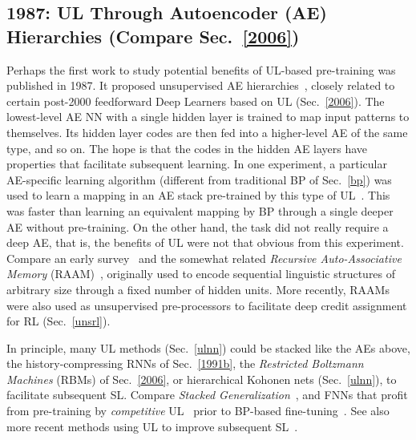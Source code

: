 \documentclass[letterpaper]{article}
\begin{document}
\begin{CJK*}{UTF8}{gbsn}
\subsection{1987: UL Through Autoencoder (AE) Hierarchies (Compare Sec.~\ref{2006})}
\label{1987}

Perhaps the first work to study
 potential benefits of UL-based pre-training was published in 1987.
It proposed unsupervised AE hierarchies~\citep{ballard1987modular}, 
closely related to certain 
post-2000 feedforward Deep Learners based on UL (Sec.~\ref{2006}).
The lowest-level AE NN with a single hidden layer is trained to map input patterns to themselves. Its hidden layer codes are then fed into a higher-level AE of the same type, and so on. The hope is that the codes in the hidden AE layers have properties that facilitate subsequent learning. 
In one experiment, a particular AE-specific learning algorithm (different from traditional  BP of Sec.~\ref{bp}) was used to
learn a mapping in an AE stack pre-trained by this type of UL~\citep{ballard1987modular}. This was faster than 
learning an equivalent mapping by BP through a single deeper AE without pre-training. 
On the other hand, the task did not really require a deep AE, that is, the benefits of UL were not that obvious from this experiment.
Compare an early survey~\citep{hinton1989connectionist} and the somewhat 
related {\em Recursive Auto-Associative Memory} (RAAM)~\citep{pollack1988implications,Pollack:90,Melnik2000},
originally used to encode sequential linguistic structures of arbitrary size 
through a fixed number of hidden units.
More recently, RAAMs were also used as unsupervised pre-processors
to facilitate deep credit assignment for RL \citep{Gisslen2011agi} (Sec.~\ref{unsrl}).

In principle, many UL methods (Sec.~\ref{ulnn}) could be stacked like the  
AEs above,
the  history-compressing RNNs of Sec.~\ref{1991b},
the {\em Restricted Boltzmann Machines} (RBMs) of Sec.~\ref{2006},
or hierarchical Kohonen nets (Sec.~\ref{ulnn}),
to facilitate subsequent SL.
Compare {\em Stacked Generalization}~\citep{wolpert:92stacked,ting1997},
and FNNs that profit from pre-training by {\em competitive} UL~\citep[e.g.,][]{RumelhartZipser:86}
prior to BP-based fine-tuning~\citep{maclin1995}.
See also more recent methods using UL to improve subsequent SL~\citep[e.g.,][]{Behnke:IJCNN1999,Behnke:IJCNN2003,wiskott2013}.



\end{CJK*}
\end{document}
